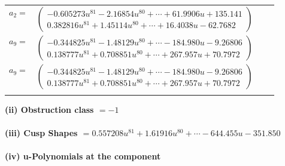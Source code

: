 \documentclass[1p]{elsarticle_modified}
\theoremstyle{definition}
\begin{document}
\begin{tabular}{m{7pt} m{180pt} m{7pt} m{180pt} }
\flushright $a_{2}=$&$\begin{pmatrix}-0.605273 u^{81}-2.16854 u^{80}+\cdots+61.9906 u+135.141\\0.382816 u^{81}+1.45114 u^{80}+\cdots+16.4038 u-62.7682\end{pmatrix}$ \\
\flushright $a_{9}=$&$\begin{pmatrix}-0.344825 u^{81}-1.48129 u^{80}+\cdots-184.980 u-9.26806\\0.138777 u^{81}+0.708851 u^{80}+\cdots+267.957 u+70.7972\end{pmatrix}$\\ \flushright $a_{9}=$&$\begin{pmatrix}-0.344825 u^{81}-1.48129 u^{80}+\cdots-184.980 u-9.26806\\0.138777 u^{81}+0.708851 u^{80}+\cdots+267.957 u+70.7972\end{pmatrix}$\\&\end{tabular}
\flushleft \textbf{(ii) Obstruction class $= -1$}\\~\\
\flushleft \textbf{(iii) Cusp Shapes $= 0.557208 u^{81}+1.61916 u^{80}+\cdots-644.455 u-351.850$}\\~\\
\newpage\renewcommand{\arraystretch}{1}
\flushleft \textbf{(iv) u-Polynomials at the component}\newline \\
\end{document}
